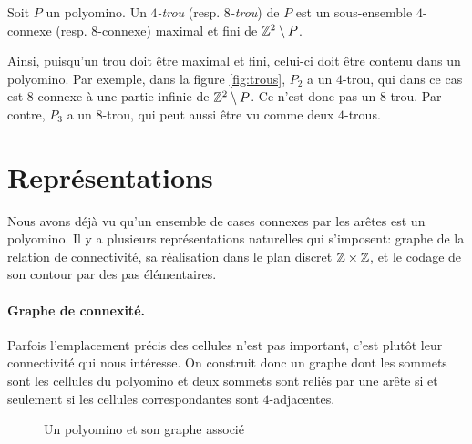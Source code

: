 \begin{definition}[Trous]\label{def:trous}
Soit $P$ un polyomino. Un \emph{$4$-trou} (resp. \emph{$8$-trou}) de $P$ est un sous-ensemble $4$-connexe (resp. $8$-connexe) maximal et fini de $\mathbb{Z}^2 \setminus P$.
\end{definition}

Ainsi, puisqu'un trou doit être maximal et fini, celui-ci doit être contenu dans un polyomino. Par exemple, dans la figure \ref{fig:trous}, $P_2$ a un $4$-trou, qui dans ce cas est $8$-connexe à une partie infinie de $\mathbb{Z}^2 \setminus P$. Ce n'est donc pas un $8$-trou. Par contre, $P_3$ a un $8$-trou, qui peut aussi être vu comme deux $4$-trous.


\section{Représentations}
Nous avons déjà vu qu'un ensemble de cases connexes par les arêtes est un polyomino.  Il y a plusieurs représentations naturelles qui s'imposent:  graphe de la relation de connectivité, sa réalisation  dans le plan discret $\mathbb{Z}\times\mathbb{Z}$, et  le codage de son contour  par des pas élémentaires. 

\paragraph{\bf Graphe de connexité.}
Parfois l'emplacement précis des cellules n'est pas important, c'est plutôt leur connectivité qui nous intéresse. On construit donc un graphe dont les sommets sont les cellules du polyomino et deux sommets sont reliés par une arête si et seulement si les cellules correspondantes sont $4$-adjacentes.
\begin{figure}[H]
\begin{subfigure}[b]{.5\textwidth}
\centering
{}
\end{subfigure}
\begin{subfigure}[b]{.5\textwidth}
\centering
{}
\end{subfigure}
\caption{Un polyomino et son graphe associé}
\end{figure}

